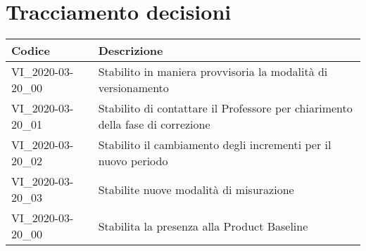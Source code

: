 \section{Tracciamento decisioni}
\renewcommand{\arraystretch}{1.8}

\begin{longtable}{|p{5cm}|p{8cm}|}
	\hline

	\rowcolor{header}
	\textbf{Codice} &  \textbf{Descrizione}\\

	\hline

	VI\_2020-03-20\_00 & Stabilito in maniera provvisoria la modalità di versionamento \\
	VI\_2020-03-20\_01 & Stabilito di contattare il Professore per chiarimento della fase di correzione \\
	VI\_2020-03-20\_02 & Stabilito il cambiamento degli incrementi per il nuovo periodo \\
	VI\_2020-03-20\_03 & Stabilite nuove modalità di misurazione \\
	VI\_2020-03-20\_00 & Stabilita la presenza alla Product Baseline \\


	\hline
\end{longtable}

